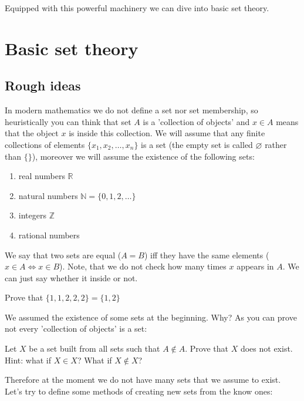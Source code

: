 \noindent Equipped with this powerful machinery we can dive into basic set theory.

\section{Basic set theory}
\label{sec:basic_set_theory}

\subsection{Rough ideas}
In modern mathematics we do not define a set nor set membership, so heuristically you can think that set $A$
is a 'collection of objects' and $x\in A$ means that the object $x$ is inside this collection. We will assume that any finite collections of elements $\{x_1, x_2, \dots, x_n\}$ is a set 
(the empty set is called $\varnothing$ rather than $\{\}$), moreover we will assume the existence of the following sets:
\begin{enumerate}
	\item real numbers $\mathbb R$
	\item natural numbers $\mathbb N=\{0,1,2,\dots\}$
	\item integers $\mathbb Z$
	\item rational numbers
\end{enumerate}

\noindent We say that two sets are equal ($A=B$) iff they have the same elements 
($x\in A\Leftrightarrow x\in B$). Note, that we do not check how many times $x$ appears in $A$. We can
just say whether it inside or not.

\begin{prob}
Prove that $\{1,1,2,2,2\}=\{1,2\}$
\end{prob}

\noindent We assumed the existence of some sets at the beginning. Why? As you can prove not every 'collection of objects' is a set:

\begin{prob}
	Let $X$ be a set built from all sets such that $A\notin A.$ Prove that $X$ does not exist.\\
	Hint: what if $X\in X$? What if $X\notin X$?
\end{prob}

Therefore at the moment we do not have many sets that we assume to exist. Let's try to define some methods of creating new sets from the know ones:

